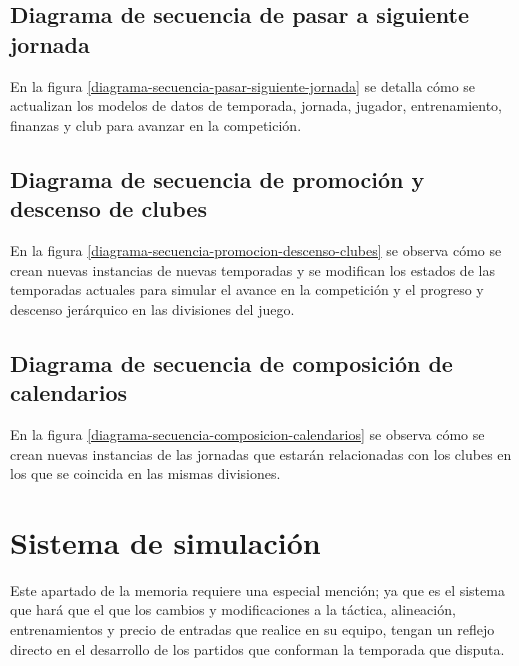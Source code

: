 

\subsection*{Diagrama de secuencia de pasar a siguiente jornada}
En la figura \ref{diagrama-secuencia-pasar-siguiente-jornada} se detalla cómo se
actualizan los modelos de datos de temporada, jornada, jugador, entrenamiento,
finanzas y club para avanzar en la competición.  \newpage
 

\subsection*{Diagrama de secuencia de promoción y descenso de clubes}
En la figura \ref{diagrama-secuencia-promocion-descenso-clubes} se observa cómo
se crean nuevas instancias de nuevas temporadas y se modifican los estados de
las temporadas actuales para simular el avance en la competición y el progreso y
descenso jerárquico en las divisiones del juego.



\subsection*{Diagrama de secuencia de composición de calendarios}
En la figura \ref{diagrama-secuencia-composicion-calendarios} se observa cómo se
crean nuevas instancias de las jornadas que estarán relacionadas con los clubes
en los que se coincida en las mismas divisiones.  \newpage


\section{Sistema de simulación}
Este apartado de la memoria requiere una especial mención; ya que es el sistema
que hará que el que los cambios y modificaciones a la táctica, alineación,
entrenamientos y precio de entradas que realice en su equipo, tengan un reflejo
directo en el desarrollo de los partidos que conforman la temporada que disputa.

